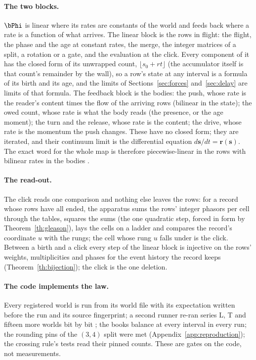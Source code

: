 \paragraph{The two blocks.} $\bPhi$ is linear where its rates are
constants of the world and feeds back where a rate is a function of what
arrives. The linear block is the rows in flight: the flight, the phase
and the age at constant rates, the merge, the integer matrices of a
split, a rotation or a gate, and the evaluation at the click. Every
component of it has the closed form of its unwrapped count, $\lfloor s_0 + rt \rfloor$ (the accumulator itself is that count's remainder by the wall), so
a row's state at any interval is a formula of its birth and its age, and the limits of Sections~\ref{sec:forces} and~\ref{sec:delay} are limits of that formula. The feedback block is
the bodies: the push, whose rate is the reader's content times the flow
of the arriving rows (bilinear in the state); the owed count, whose rate
is what the body reads (the presence, or the age moment); the turn and
the release, whose rate is the content; the drive, whose rate is the
momentum the push changes. These have no closed form; they are iterated,
and their continuum limit is the differential equation $d\mathbf s/dt =
\mathbf r(\mathbf s)$. The exact word for the whole map is therefore
piecewise-linear in the rows with bilinear rates in the bodies
\cite{derivations}.

\paragraph{The read-out.} The click reads one comparison and nothing else leaves the rows: for a record whose rows have all ended, the apparatus
sums the rows' integer phasors per cell through the tables, squares the sums (the one quadratic step, forced in form by Theorem~\ref{th:gleason}), lays the cells on a ladder and compares the record's coordinate $u$ with the rungs; the cell whose rung $u$ falls under is the click. Between a birth and a
click every step of the linear block is injective on the rows' weights, multiplicities and phases for the event history the record keeps (Theorem~\ref{th:bijection}); the click is the one deletion.

\paragraph{The code implements the law.} Every registered world is run
from its world file with its expectation written before the run and its
source fingerprint; a second runner re-ran series L, T and fifteen more worlds bit by bit \cite{replications}; the books balance at every interval in every
run; the rounding pins of the $(3, 4)$ split were met (Appendix~\ref{app:reproduction});
the crossing rule's tests read their pinned counts. These are
gates on the code, not measurements.

